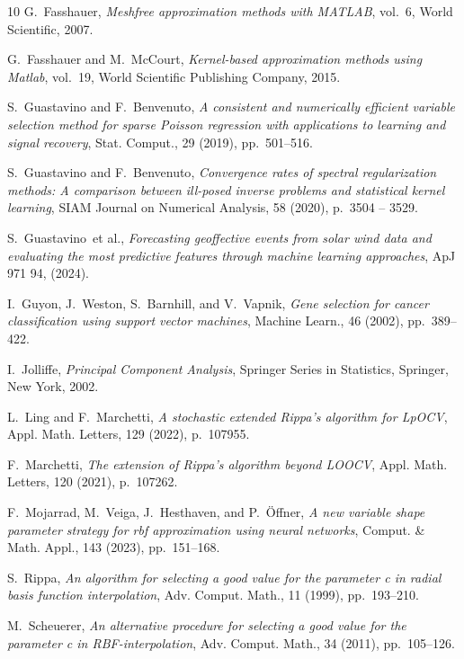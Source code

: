 \documentclass[hyphens,a4paper,11pt]{article}
\begin{document}
\begin{thebibliography}{10}
{\sc G.~Fasshauer}, {\em Meshfree approximation methods with MATLAB}, vol.~6, World Scientific, 2007.

{\sc G.~Fasshauer and M.~McCourt}, {\em Kernel-based approximation methods using Matlab}, vol.~19, World Scientific Publishing Company, 2015.

{\sc S.~Guastavino and F.~Benvenuto}, {\em A consistent and numerically efficient variable selection method for sparse {P}oisson regression with applications to learning and signal recovery}, Stat. Comput., 29 (2019), pp.~501--516.

{\sc S.~Guastavino and F.~Benvenuto}, {\em Convergence rates of spectral regularization methods: A comparison between ill-posed inverse problems and statistical kernel learning}, SIAM Journal on Numerical Analysis, 58 (2020), p.~3504 – 3529.

{\sc S.~Guastavino~et al.}, {\em Forecasting geoffective events from solar wind data and evaluating the most predictive features through machine learning approaches}, ApJ 971 94,  (2024).

{\sc I.~Guyon, J.~Weston, S.~Barnhill, and V.~Vapnik}, {\em Gene selection for cancer classification using support vector machines}, Machine Learn., 46 (2002), pp.~389--422.

{\sc I.~Jolliffe}, {\em Principal Component Analysis}, Springer Series in Statistics, Springer, New York, 2002.

{\sc L.~Ling and F.~Marchetti}, {\em A stochastic extended {R}ippa’s algorithm for {LpOCV}}, Appl. Math. Letters, 129 (2022), p.~107955.

{\sc F.~Marchetti}, {\em The extension of {R}ippa’s algorithm beyond {LOOCV}}, Appl. Math. Letters, 120 (2021), p.~107262.

{\sc F.~Mojarrad, M.~Veiga, J.~Hesthaven, and P.~{\"O}ffner}, {\em A new variable shape parameter strategy for rbf approximation using neural networks}, Comput. \& Math. Appl., 143 (2023), pp.~151--168.

{\sc S.~Rippa}, {\em An algorithm for selecting a good value for the parameter c in radial basis function interpolation}, Adv. Comput. Math., 11 (1999), pp.~193--210.

{\sc M.~Scheuerer}, {\em An alternative procedure for selecting a good value for the parameter c in {RBF}-interpolation}, Adv. Comput. Math., 34 (2011), pp.~105--126.


\end{thebibliography}
\end{document}
